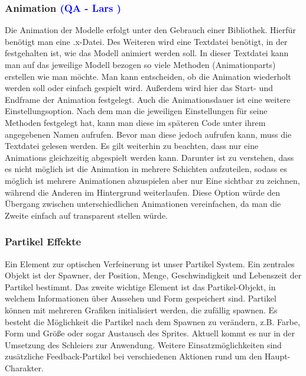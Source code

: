 \documentclass[12pt]{article}
\begin{document}
\vspace{1cm}
\subsubsection{Animation \textcolor{blue}{(QA - Lars )}}
Die Animation der Modelle erfolgt unter den Gebrauch einer Bibliothek. Hierfür benötigt man eine .x-Datei.
Des Weiteren wird eine Textdatei benötigt, in der festgehalten ist, wie das Modell animiert werden soll.
In dieser Textdatei kann man auf das jeweilige Modell bezogen so viele Methoden (Animationparts) erstellen
wie man möchte. Man kann entscheiden, ob die Animation wiederholt werden soll oder einfach gespielt wird.
Außerdem wird hier das Start- und Endframe der Animation festgelegt. Auch die Animationsdauer ist eine weitere
Einstellungsoption. Nach dem man die jeweiligen Einstellungen für seine Methoden festgelegt hat, kann man diese
im späteren Code unter ihrem angegebenen Namen aufrufen. Bevor man diese jedoch aufrufen kann, muss die
Textdatei gelesen werden. Es gilt weiterhin zu beachten, dass nur eine Animations gleichzeitig abgespielt werden kann.
Darunter ist zu verstehen, dass es nicht möglich ist die Animation in mehrere Schichten aufzuteilen, sodass es möglich ist
mehrere Animationen abzuspielen aber nur Eine sichtbar zu zeichnen, während die Anderen im Hintergrund weiterlaufen.
Diese Option würde den Übergang zwischen unterschiedlichen Animationen vereinfachen, da man die Zweite einfach auf
transparent stellen würde.

\vspace{1cm}
\subsubsection{Partikel Effekte}
Ein Element zur optischen Verfeinerung ist unser Partikel System.
Ein zentrales Objekt ist der Spawner, der Position, Menge, Geschwindigkeit und Lebenszeit der Partikel bestimmt. Das zweite wichtige Element ist das Partikel-Objekt, in welchem Informationen über Aussehen und Form gespeichert sind. Partikel können mit mehreren Grafiken initialisiert werden, die zufällig spawnen. Es besteht die Möglichkeit die Partikel nach dem Spawnen zu verändern, z.B. Farbe, Form und Größe oder sogar Austausch des Sprites.
Aktuell kommt es nur in der Umsetzung des Schleiers zur Anwendung.
Weitere Einsatzmöglichkeiten sind zusätzliche Feedback-Partikel bei verschiedenen Aktionen rund um den Haupt-Charakter.

\vspace{2cm}
\end{document}
